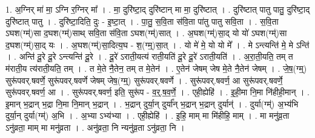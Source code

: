 \documentclass[17pt]{extarticle}
\begin{document}
1. अ॒ग्निर् मा॑ मा॒ ऽग्नि र॒ग्निर् मा᳚ । . मा॒ दुरि॑ष्टा॒द् दुरि॑ष्टान् मा मा॒ दुरि॑ष्टात् । . दुरि॑ष्टात् पातु पातु॒ दुरि॑ष्टा॒द् दुरि॑ष्टात् पातु । . दुरि॑ष्टा॒दिति॒ दुः - इ॒ष्टा॒त् । . पा॒तु॒ स॒वि॒ता स॑वि॒ता पा॑तु पातु सवि॒ता । . स॒वि॒ता ऽघश(ग्म्॑)सा द॒घश(ग्म्॑)साथ् सवि॒ता स॑वि॒ता ऽघश(ग्म्॑)सात् । . अ॒घश(ग्म्॑)सा॒द् यो यो॑ ऽघश(ग्म्॑)सा द॒घश(ग्म्॑)सा॒द् यः । . अ॒घश(ग्म्॑)सा॒दित्य॒घ - श॒(ग्म्॒)सा॒त् । . यो मे॑ मे॒ यो यो मे᳚ । . मे ऽन्त्यन्ति॑ मे॒ मे ऽन्ति॑ । . अन्ति॑ दू॒रे दू॒रे ऽन्त्यन्ति॑ दू॒रे । . दू॒रे॑ ऽराती॒यत्य॑ राती॒यति॑ दू॒रे दू॒रे॑ ऽराती॒यति॑ । . अ॒रा॒ती॒यति॒ तम् त म॑राती॒य त्य॑राती॒यति॒ तम् । . त मे॒ते नै॒तेन॒ तम् त मे॒तेन॑ । . ए॒तेन॑ जेषम् जेष मे॒ते नै॒तेन॑ जेषम् । . जे॒ष॒(ग्म्॒) सुरू॑पवर्.षवर्णे॒ सुरू॑पवर्.षवर्णे जेषम् जेष॒(ग्म्॒) सुरू॑पवर्.षवर्णे । . सुरू॑पवर्.षवर्ण॒ आ सुरू॑पवर्.षवर्णे॒ सुरू॑पवर्.षवर्ण॒ आ । . सुरू॑पवर्.षवर्ण॒ इति॒ सुरू॑प - व॒र्॒.ष॒व॒र्णे॒ । . एही॒ह्येहि॑ । . इ॒ही॒मा नि॒मा नि॑हीही॒मान् । . इ॒मान् भ॒द्रान् भ॒द्रा नि॒मा नि॒मान् भ॒द्रान् । . भ॒द्रान् दुर्या॒न् दुर्या᳚न् भ॒द्रान् भ॒द्रान् दुर्यान्॑ । . दुर्या(ग्म्॑) अ॒भ्य॑भि दुर्या॒न् दुर्या(ग्म्॑) अ॒भि । . अ॒भ्या ऽभ्य॑भ्या । . एही॒ह्येहि॑ । . इ॒हि॒ माम् मा मि॑हीहि॒ माम् । . मा मनु॑व्र॒ता ऽनु॑व्रता॒ माम् मा मनु॑व्रता । . अनु॑व्रता॒ नि न्यनु॑व्र॒ता ऽनु॑व्रता॒ नि । \newline
\end{document}
